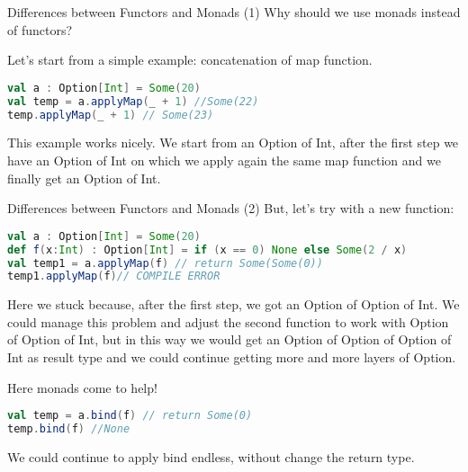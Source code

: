 \begin{frame}[fragile]{Differences between Functors and Monads (1)}
	Why should we use monads instead of functors?
	
	Let's start from a simple example: concatenation of map function.
\begin{lstlisting}[language=scala]
val a : Option[Int] = Some(20)
val temp = a.applyMap(_ + 1) //Some(22)
temp.applyMap(_ + 1) // Some(23)
\end{lstlisting}				
	This example works nicely. We start from an Option of Int, after the first step we have an Option of Int on which we apply again 
	the same map function and we finally get an Option of Int.
\end{frame}

\begin{frame}[fragile]{Differences between Functors and Monads (2)}
	But, let's try with a new function:
\begin{lstlisting}[language=scala]
val a : Option[Int] = Some(20)		
def f(x:Int) : Option[Int] = if (x == 0) None else Some(2 / x)
val temp1 = a.applyMap(f) // return Some(Some(0))
temp1.applyMap(f)// COMPILE ERROR
\end{lstlisting}	
	Here we stuck because, after the first step, we got an Option of Option of Int. 
	We could manage this problem and adjust the second function	to work with Option of Option of Int, 
	but in this way we would get an Option of Option of Option of Int as result type and we could continue getting more and more layers of Option.
	
	\pause
	
	Here monads come to help!
\begin{lstlisting}[language=scala]
val temp = a.bind(f) // return Some(0)
temp.bind(f) //None
\end{lstlisting}	
	We could continue to apply bind endless, without change the return type.
\end{frame}
